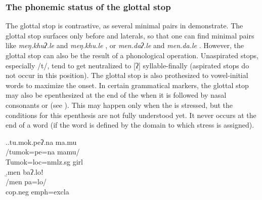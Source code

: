 \subsubsection{The phonemic status of the glottal stop}

The glottal stop is contrastive, as several minimal pairs in   demonstrate. The glottal stop surfaces only before  and laterals, so that one can find minimal pairs like  \emph{meŋ.khuʔ.le}  and \mbox{\emph{meŋ.khu.le}} , or \emph{men.daʔ.le}  and \emph{men.da.le} . However, the glottal stop can also be the result of a phonological operation. Unaspirated stops, especially /t/, tend to get neutralized to [ʔ] syllable-finally (aspirated stops do not occur in this position). The glottal stop is also prothesized to vowel-initial words to maximize the onset. In certain grammatical markers, the glottal stop may also  be epenthesized at the end of the  when it is followed by  nasal consonants or   (see \Next). This may happen only when the  is stressed, but the conditions for this epenthesis are not fully understood yet. It never occurs at the end of a word (if the word is defined by the domain to which stress is assigned). 

\ex.\a.\glll tu.mok.peʔ.na ma.mu\\
/tumok=pe=na mamu/\\
Tumok{\sc =loc=nmlz.sg} girl\\
\b.\glll men baʔ.loǃ\\
/men pa=lo/\\
{\sc cop.neg} {\sc emph=excla}\\


